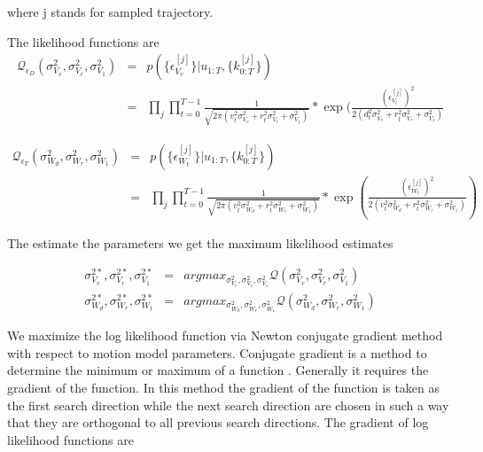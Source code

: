 \documentclass[12pt,draft]{dalcsthesis}
\begin{document}
where j stands for sampled trajectory.

The likelihood functions are 
\begin{eqnarray}
\mathcal{Q}_{\epsilon_{D}}(\sigma_{V_{v}}^{2},\sigma_{V_{r}}^{2},\sigma_{V_{1}}^{2}) & = & p(\{\epsilon_{V_{v}}^{[j]}\}|u_{1:T},\{k_{0:T}^{[j]}\})\\
 & = & \prod_{j}\prod_{t=0}^{T-1}\frac{1}{\sqrt{2\pi(v_{t}^{2}\sigma_{V_{v}}^{2}+r_{t}^{2}\sigma_{V_{r}}^{2}+\sigma_{V_{1}}^{2})}}*\exp(\frac{(\epsilon_{V_{t}}^{[j]})^{2}}{2(d_{t}^{2}\sigma_{V_{v}}^{2}+r_{t}^{2}\sigma_{V_{r}}^{2}+\sigma_{V_{1}}^{2})}
\end{eqnarray}



\begin{eqnarray*}
\mathcal{Q}_{\epsilon_{T}}(\sigma_{W_{d}}^{2},\sigma_{W_{r}}^{2},\sigma_{W_{1}}^{2}) & = & p(\{\epsilon_{W_{t}}^{[j]}\}|u_{1:T},\{k_{0:T}^{[j]}\})\\
 & = & \prod_{j}\prod_{t=0}^{T-1}\frac{1}{\sqrt{2\pi(v_{t}^{2}\sigma_{W_{d}}^{2}+r_{t}^{2}\sigma_{W_{r}}^{2}+\sigma_{W_{1}}^{2})}}*\exp(\frac{(\epsilon_{W_{t}}^{[j]})^{2}}{2(v_{t}^{2}\sigma_{W_{d}}^{2}+r_{t}^{2}\sigma_{W_{r}}^{2}+\sigma_{W_{1}}^{2})})
\end{eqnarray*}


The estimate the parameters we get the maximum likelihood estimates 

\begin{eqnarray}
\sigma_{V_{v}}^{2*},\sigma_{V_{r}}^{2*},\sigma_{V_{1}}^{2*} & = & argmax_{\sigma_{V_{v}}^{2},\sigma_{V_{r}}^{2},\sigma_{V_{1}}^{2}}\mathcal{Q}(\sigma_{V_{v}}^{2},\sigma_{V_{r}}^{2},\sigma_{V_{1}}^{2})\\
\sigma_{W_{d}}^{2*},\sigma_{W_{r}}^{2*},\sigma_{W_{1}}^{2*} & = & argmax_{\sigma_{W_{d}}^{2},\sigma_{W_{r}}^{2},\sigma_{W_{1}}^{2}}\mathcal{Q}(\sigma_{W_{d}}^{2},\sigma_{W_{r}}^{2},\sigma_{W_{1}}^{2})
\end{eqnarray}

We maximize the log likelihood function via Newton conjugate gradient method with respect to motion model parameters. Conjugate gradient is a method to determine the minimum or maximum of a function \cite{shewchuk1994introduction}. Generally it requires the gradient of the function. In this method the gradient of the function is taken as the first search direction while the next search direction are chosen in such a way that they are orthogonal to all previous search directions. The gradient of log likelihood functions are 
\end{document}
